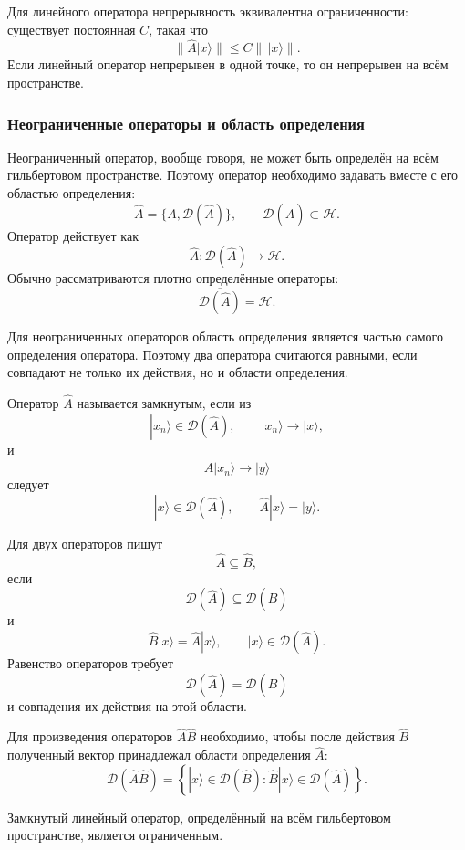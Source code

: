 \documentclass[12pt,a4paper]{article}
\begin{document}
Для линейного оператора непрерывность эквивалентна ограниченности:
существует постоянная $C$, такая что
\[
    \boxed{
        \|\hat A|x\rangle\|
        \leq
        C\|\,|x\rangle\|
    }.
\]
Если линейный оператор непрерывен в одной точке, то он непрерывен на
всём пространстве.

\subsubsection{Неограниченные операторы и область определения}

Неограниченный оператор, вообще говоря, не может быть определён на
всём гильбертовом пространстве. Поэтому оператор необходимо задавать
вместе с его областью определения:
\[
    \boxed{
        \hat A
        =
        \{A,\mathcal D(\hat A)\}
    },
    \qquad
    \mathcal D(\hat A)\subset\mathcal H.
\]
Оператор действует как
\[
    \hat A:
    \mathcal D(\hat A)\to\mathcal H.
\]
Обычно рассматриваются плотно определённые операторы:
\[
    \boxed{
        \overline{\mathcal D(\hat A)}
        =
        \mathcal H
    }.
\]

Для неограниченных операторов область определения является частью
самого определения оператора. Поэтому два оператора считаются равными,
если совпадают не только их действия, но и области определения.

Оператор $\hat A$ называется замкнутым, если из
\[
    |x_n\rangle\in\mathcal D(\hat A),
    \qquad
    |x_n\rangle\to|x\rangle,
\]
и
\[
    \hat A|x_n\rangle\to|y\rangle
\]
следует
\[
    \boxed{
        |x\rangle\in\mathcal D(\hat A),
        \qquad
        \hat A|x\rangle=|y\rangle
    }.
\]

Для двух операторов пишут
\[
    \hat A\subseteq\hat B,
\]
если
\[
    \mathcal D(\hat A)\subseteq\mathcal D(\hat B)
\]
и
\[
    \boxed{
        \hat B|x\rangle
        =
        \hat A|x\rangle,
        \qquad
        |x\rangle\in\mathcal D(\hat A)
    }.
\]
Равенство операторов требует
\[
    \boxed{
        \mathcal D(\hat A)=\mathcal D(\hat B)
    }
\]
и совпадения их действия на этой области.

Для произведения операторов $\hat A\hat B$ необходимо, чтобы после
действия $\hat B$ полученный вектор принадлежал области определения
$\hat A$:
\[
    \mathcal D(\hat A\hat B)
    =
    \left\{
        |x\rangle\in\mathcal D(\hat B):
        \hat B|x\rangle\in\mathcal D(\hat A)
    \right\}.
\]

Замкнутый линейный оператор, определённый на всём гильбертовом
пространстве, является ограниченным.
\end{document}
